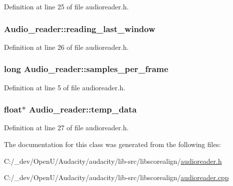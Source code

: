 Definition at line 25 of file audioreader.\+h.

\subsubsection[{\texorpdfstring{reading\+\_\+last\+\_\+window}{reading_last_window}}]{ Audio\+\_\+reader\+::reading\+\_\+last\+\_\+window\hspace{0.3cm}{\ttfamily [protected]}}\hypertarget{class_audio__reader_a25b2f0807424d963bae6daa4b791a37b}{}\label{class_audio__reader_a25b2f0807424d963bae6daa4b791a37b}


Definition at line 26 of file audioreader.\+h.

\subsubsection[{\texorpdfstring{samples\+\_\+per\+\_\+frame}{samples_per_frame}}]{\setlength{\rightskip}{0pt plus 5cm}long Audio\+\_\+reader\+::samples\+\_\+per\+\_\+frame}\hypertarget{class_audio__reader_a3932b89b7f9a24ab2f41216e2c8e4a95}{}\label{class_audio__reader_a3932b89b7f9a24ab2f41216e2c8e4a95}


Definition at line 5 of file audioreader.\+h.

\subsubsection[{\texorpdfstring{temp\+\_\+data}{temp_data}}]{\setlength{\rightskip}{0pt plus 5cm}float$\ast$ Audio\+\_\+reader\+::temp\+\_\+data\hspace{0.3cm}{\ttfamily [protected]}}\hypertarget{class_audio__reader_a11979e55124ff3492e16ec3855e92a4c}{}\label{class_audio__reader_a11979e55124ff3492e16ec3855e92a4c}


Definition at line 27 of file audioreader.\+h.



The documentation for this class was generated from the following files\+:\begin{DoxyCompactItemize}
\item 
C\+:/\+\_\+dev/\+Open\+U/\+Audacity/audacity/lib-\/src/libscorealign/\hyperlink{audioreader_8h}{audioreader.\+h}\item 
C\+:/\+\_\+dev/\+Open\+U/\+Audacity/audacity/lib-\/src/libscorealign/\hyperlink{audioreader_8cpp}{audioreader.\+cpp}\end{DoxyCompactItemize}
